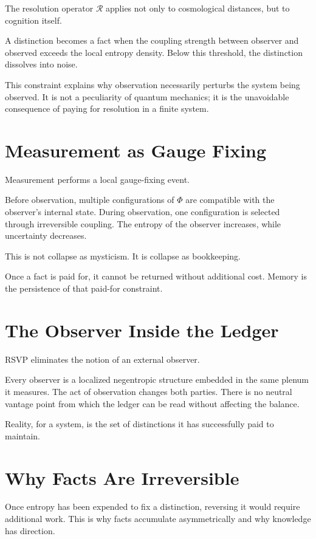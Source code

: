 \documentclass[11pt]{book}
\begin{document}
The resolution operator \(\mathcal{R}\) applies not only to cosmological distances, but to cognition itself.

A distinction becomes a fact when the coupling strength between observer and observed exceeds the local entropy density. Below this threshold, the distinction dissolves into noise.

This constraint explains why observation necessarily perturbs the system being observed. It is not a peculiarity of quantum mechanics; it is the unavoidable consequence of paying for resolution in a finite system.

\section{Measurement as Gauge Fixing}

Measurement performs a local gauge-fixing event.

Before observation, multiple configurations of \(\Phi\) are compatible with the observer’s internal state. During observation, one configuration is selected through irreversible coupling. The entropy of the observer increases, while uncertainty decreases.

This is not collapse as mysticism. It is collapse as bookkeeping.

Once a fact is paid for, it cannot be returned without additional cost. Memory is the persistence of that paid-for constraint.

\section{The Observer Inside the Ledger}

RSVP eliminates the notion of an external observer.

Every observer is a localized negentropic structure embedded in the same plenum it measures. The act of observation changes both parties. There is no neutral vantage point from which the ledger can be read without affecting the balance.

Reality, for a system, is the set of distinctions it has successfully paid to maintain.

\section{Why Facts Are Irreversible}

Once entropy has been expended to fix a distinction, reversing it would require additional work. This is why facts accumulate asymmetrically and why knowledge has direction.
\end{document}
